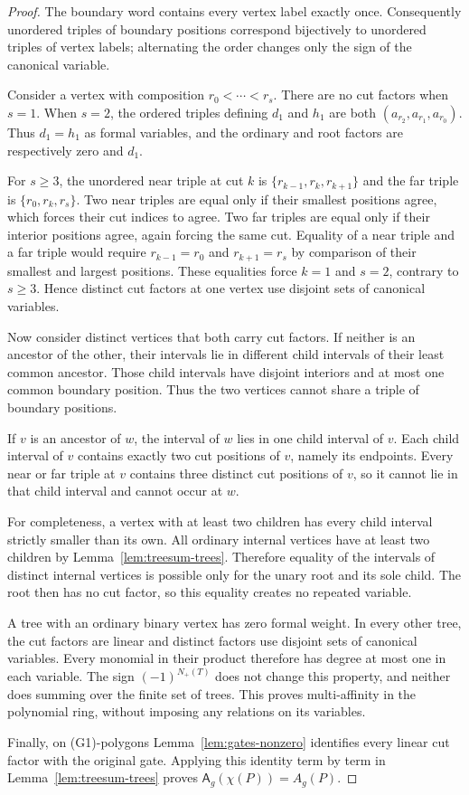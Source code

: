 \begin{proof}
The boundary word contains every vertex label exactly once.
Consequently unordered triples of boundary positions correspond
bijectively to unordered triples of vertex labels; alternating
the order changes only the sign of the canonical variable.

Consider a vertex with composition $r_0<\cdots<r_s$.
There are no cut factors when $s=1$. When $s=2$, the ordered
triples defining $d_1$ and $h_1$ are both
$(a_{r_2},a_{r_1},a_{r_0})$. Thus $d_1=h_1$ as formal
variables, and the ordinary and root factors are respectively
zero and $d_1$.

For $s\geq3$, the unordered near triple at cut $k$ is
$\{r_{k-1},r_k,r_{k+1}\}$ and the far triple is
$\{r_0,r_k,r_s\}$. Two near triples are equal only if their
smallest positions agree, which forces their cut indices to
agree. Two far triples are equal only if their interior
positions agree, again forcing the same cut. Equality of a
near triple and a far triple would require
$r_{k-1}=r_0$ and $r_{k+1}=r_s$ by comparison of their smallest
and largest positions. These equalities force $k=1$ and $s=2$,
contrary to $s\geq3$. Hence distinct cut factors at one vertex
use disjoint sets of canonical variables.

Now consider distinct vertices that both carry cut factors.
If neither is an ancestor of the other, their intervals lie
in different child intervals of their least common ancestor.
Those child intervals have disjoint interiors and at most one
common boundary position. Thus the two vertices cannot share
a triple of boundary positions.

If $v$ is an ancestor of $w$, the interval of $w$ lies in one
child interval of $v$. Each child interval of $v$ contains
exactly two cut positions of $v$, namely its endpoints.
Every near or far triple at $v$ contains three distinct cut
positions of $v$, so it cannot lie in that child interval
and cannot occur at $w$.

For completeness, a vertex with at least two children has
every child interval strictly smaller than its own.
All ordinary internal vertices have at least two children
by Lemma~\ref{lem:treesum-trees}. Therefore equality of the
intervals of distinct internal vertices is possible only
for the unary root and its sole child. The root then has no
cut factor, so this equality creates no repeated variable.

A tree with an ordinary binary vertex has zero formal weight.
In every other tree, the cut factors are linear and distinct
factors use disjoint sets of canonical variables. Every
monomial in their product therefore has degree at most one
in each variable. The sign $(-1)^{N_+(T)}$ does not change
this property, and neither does summing over the finite set
of trees. This proves multi-affinity in the polynomial ring,
without imposing any relations on its variables.

Finally, on (G1)-polygons Lemma~\ref{lem:gates-nonzero}
identifies every linear cut factor with the original gate.
Applying this identity term by term in
Lemma~\ref{lem:treesum-trees} proves
$\mathsf A_g(\chi(P))=A_g(P)$.
\end{proof}


